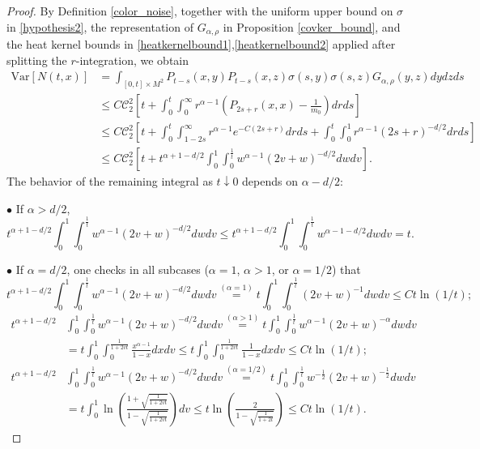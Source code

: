 \documentclass[12pt]{amsart}
\numberwithin{equation}{section}
\newcommand{\1}{\mathbf{1}}
\begin{document}
\begin{proof}
    By Definition \ref{color_noise}, together with the uniform upper bound on $\sigma$ in \eqref{hypothesis2}, the representation of $G_{\alpha,\rho}$ in Proposition \ref{covker_bound}, and the heat kernel bounds in \eqref{heatkernelbound1},\eqref{heatkernelbound2} applied after splitting the $r$-integration, we obtain
    \begin{equation*}
    \begin{split}
        \text{Var}[N(t,x)] &= \int_{[0,t]\times M^2}P_{t-s}(x,y)P_{t-s}(x,z)\sigma(s,y)\sigma(s,z)G_{\alpha,\rho}(y,z)dydzds\\
        &\leq C\mathcal{C}_2^2\left[t+ \int_0^t\int_0^\infty r^{\alpha-1}\left(P_{2s+r}(x,x)-\frac{1}{m_0}\right)drds\right]\\
        &\leq C\mathcal{C}_2^2\left[t+\int_0^t\int_{1-2s}^\infty r^{\alpha-1}e^{-C(2s+r)}drds +\int_0^t\int_0^1r^{\alpha-1}(2s+r)^{-d/2}drds\right]\\
        & \leq C\mathcal{C}_2^2\left[t+t^{\alpha+1-d/2}\int_0^1\int_0^{\frac{1}{t}}w^{\alpha-1}(2v+w)^{-d/2}dwdv \right].
    \end{split}
    \end{equation*}
    The behavior of the remaining integral as $t\downarrow0$ depends on $\alpha-d/2$:

    $\bullet$ If $\alpha>d/2$,  
    \begin{equation*}
        t^{\alpha+1-d/2}\int_0^1\int_0^{\frac{1}{t}}w^{\alpha-1}(2v+w)^{-d/2}dwdv \leq t^{\alpha+1-d/2}\int_0^1\int_0^{\frac{1}{t}}w^{\alpha-1-d/2}dwdv=t.
    \end{equation*}

    $\bullet$ If $\alpha=d/2$, one checks in all subcases ($\alpha=1$, $\alpha>1$, or $\alpha=1/2$) that
    \begin{equation*}
        t^{\alpha+1-d/2}\int_0^1\int_0^{\frac{1}{t}}w^{\alpha-1}(2v+w)^{-d/2}dwdv\overset{(\alpha=1)}{=}t\int_0^1\int_0^{\frac{1}{t}}(2v+w)^{-1}dwdv\leq Ct\ln(1/t);
    \end{equation*}
    \begin{equation*}
    \begin{split}
        t^{\alpha+1-d/2}&\int_0^1\int_0^{\frac{1}{t}}w^{\alpha-1}(2v+w)^{-d/2}dwdv\overset{(\alpha>1)}{=}t\int_0^1\int_0^{\frac{1}{t}}w^{\alpha-1}(2v+w)^{-\alpha}dwdv\\
        &=t\int_0^1\int_0^{\frac{1}{1+2vt}}\frac{x^{\alpha-1}}{1-x}dxdv\leq t\int_0^1\int_0^{\frac{1}{1+2vt}}\frac{1}{1-x}dxdv\leq Ct\ln(1/t);
    \end{split}
    \end{equation*}
    \begin{equation*}
    \begin{split}
        t^{\alpha+1-d/2}&\int_0^1\int_0^{\frac{1}{t}}w^{\alpha-1}(2v+w)^{-d/2}dwdv\overset{(\alpha=1/2)}{=}t\int_0^1\int_0^{\frac{1}{t}}w^{-\frac{1}{2}}(2v+w)^{-\frac{1}{2}}dwdv\\
        &=t\int_0^1\ln\left(\frac{1+\sqrt{\frac{1}{1+2vt}}}{1-\sqrt{\frac{1}{1+2vt}}}\right)dv\leq t\ln\left(\frac{2}{1-\sqrt{\frac{1}{1+2t}}}\right)\leq Ct\ln(1/t).
    \end{split}
    \end{equation*}


\end{proof}
\end{document}
